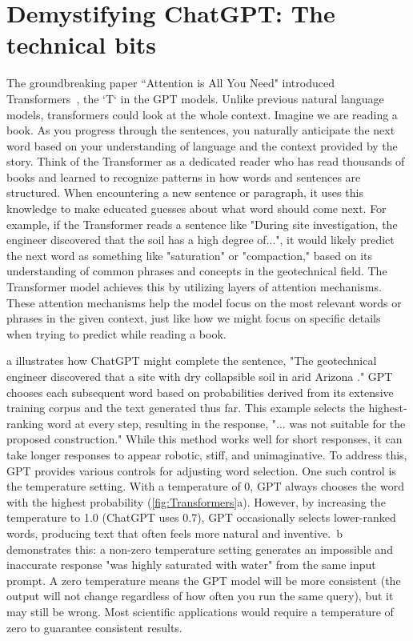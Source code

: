 \documentclass{article}
\begin{document}
\section{Demystifying ChatGPT: The technical bits}
The groundbreaking paper ``Attention is All You Need" introduced Transformers~\parencite{vaswani2017attention}, the `T` in the GPT models. Unlike previous natural language models, transformers could look at the whole context. Imagine we are reading a book. As you progress through the sentences, you naturally anticipate the next word based on your understanding of language and the context provided by the story. Think of the Transformer as a dedicated reader who has read thousands of books and learned to recognize patterns in how words and sentences are structured. When encountering a new sentence or paragraph, it uses this knowledge to make educated guesses about what word should come next. For example, if the Transformer reads a sentence like "During site investigation, the engineer discovered that the soil has a high degree of...", it would likely predict the next word as something like "saturation" or "compaction," based on its understanding of common phrases and concepts in the geotechnical field. The Transformer model achieves this by utilizing layers of attention mechanisms. These attention mechanisms help the model focus on the most relevant words or phrases in the given context, just like how we might focus on specific details when trying to predict while reading a book.

a illustrates how ChatGPT might complete the sentence, "The geotechnical engineer discovered that a site with dry collapsible soil in arid Arizona \underline{\hspace{1cm}}." GPT chooses each subsequent word based on probabilities derived from its extensive training corpus and the text generated thus far. This example selects the highest-ranking word at every step, resulting in the response, "... was not suitable for the proposed construction." While this method works well for short responses, it can take longer responses to appear robotic, stiff, and unimaginative. To address this, GPT provides various controls for adjusting word selection. One such control is the temperature setting. With a temperature of 0, GPT always chooses the word with the highest probability (\cref{fig:Transformers}a). However, by increasing the temperature to 1.0 (ChatGPT uses 0.7), GPT occasionally selects lower-ranked words, producing text that often feels more natural and inventive.~b demonstrates this: a non-zero temperature setting generates an impossible and inaccurate response "was highly saturated with water" from the same input prompt. A zero temperature means the GPT model will be more consistent (the output will not change regardless of how often you run the same query), but it may still be wrong. Most scientific applications would require a temperature of zero to guarantee consistent results. 
\end{document}

